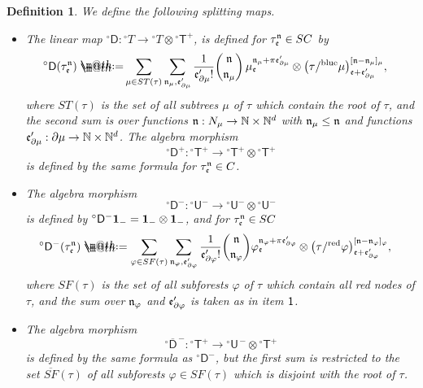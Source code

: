 \documentclass[10pt, reqno]{amsart}
\makeatletter
\numberwithin{subsection}{section}
\numberwithin{subsubsection}{subsection}
\numberwithin{equation}{section} %
\theoremstyle{mystyle}
\theoremstyle{mystyle2}
\newtheorem*{defn*} {Definition}
\theoremstyle{mystyle3}
\newcommand{\sfT}{\mathsf{T}}
\newcommand{\sfU}{\mathsf{U}}
\newcommand{\sfD}{\mathsf{D}}
\newcommand\bbN{\mathbb{N}}
\newcommand*{\defeq}{\mathrel{\rlap{%
                     \raisebox{0.3ex}{$\m@th\cdot$}}%
                     \raisebox{-0.3ex}{$\m@th\cdot$}}%
                     =}
\makeatother
\begin{document}
\begin{defn*}
We define the following splitting maps.
\begin{itemize}
\setlength{\itemsep}{0.15cm}
	\item[{\sf 1.}] The linear map ${^\circ}{\sfD} : {^\circ}T\to {^\circ}T\otimes {^\circ}{\sfT}^+$, is defined for $\tau_{\frak{e}}^{\frak{n}}\in SC$ by
\begin{equation*} \begin{split}
{^\circ}\sfD(\tau_{\frak{e}}^{\frak{n}}) \defeq & \sum_{\mu\in ST(\tau)} \sum_{\frak{n}_\mu, \frak{e}'_{\partial\mu}} 
\frac{1}{\frak{e}'_{\partial\mu}!}{{\frak{n}}\choose{\frak{n}_\mu}}
\, \mu^{\frak{n}_\mu+\pi\frak{e}'_{\partial\mu}}_{\frak{e}}
\otimes 
\big(\tau/^{\text{\rm blue}}\mu\big)^{[\frak{n}-\frak{n}_\mu]_\mu}_{\frak{e}+\frak{e}'_{\partial\mu}},
\end{split}  \end{equation*}
where $ST(\tau)$ is the set of all {\sl subtrees} $\mu$ of $\tau$ which contain the root of $\tau$, and the second sum is over functions $\frak{n}:N_\mu\to\bbN\times\bbN^d$ with $\frak{n}_\mu\leq \frak{n}$ and functions $\frak{e}'_{\partial\mu}: \partial\mu\rightarrow\bbN\times\bbN^d$. The algebra morphism 
$$
{^\circ}{\sfD}^+ : {^\circ}{\sfT}^+\to{^\circ}{\sfT}^+\otimes{^\circ}{\sfT}^+
$$ 
is defined by the same formula for $\tau_{\frak{e}}^{\frak{n}}\in C$.

	\item[{\sf 2.}] The algebra morphism 
	$$
	{^\circ}{\sfD}^-: {^\circ}{\sfU}^-\to{^\circ}{\sfU}^-\otimes {^\circ}{\sfU}^-
	$$ 
	is defined by ${^\circ}\sfD^-{\bf1}_-={\bf1}_-\otimes{\bf1}_-$, and for $\tau_{\frak{e}}^{\frak{n}}\in SC$
\begin{equation*} \begin{split}
{^\circ}{\sfD}^-(\tau_{\frak{e}}^{\frak{n}})
&\defeq  \sum_{\varphi\in SF(\tau)}\sum_{\frak{n}_\varphi, \frak{e}'_{\partial\varphi}} \frac{1}{\frak{e}'_{\partial\varphi}!}{{\frak{n}}\choose{\frak{n}_\varphi}}
\varphi^{\frak{n}_\varphi+\pi\frak{e}'_{\partial\varphi}}_{\frak{e}} 
\otimes \big(\tau/^{\text{\rm red}}\varphi\big)^{[\frak{n}-\frak{n_\varphi}]_\varphi}_{\frak{e}+\frak{e}'_{\partial\varphi}},
\end{split}  \end{equation*}
where $SF(\tau)$ is the set of all {\sl subforests} $\varphi$ of $\tau$ {\sl which contain all red nodes of $\tau$}, and the sum over $\frak{n}_\varphi$ and $\frak{e}_{\partial\varphi}'$ is taken as in item $\sf 1$.

	\item[{\sf 3.}] The algebra morphism 
	$$
	{^\circ}\overline{\sfD}^{\,-} : {^\circ}{\sfT}^+\to{^\circ}{\sfU}^{\,-}\otimes {^\circ}{\sfT}^+
	$$ 
	is defined by the same formula as ${^\circ}{\sfD}^-$, but the first sum is restricted to the set $\overline{SF}(\tau)$ of all subforests $\varphi\in SF(\tau)$ {\sl which is disjoint with the root of $\tau$}.
\end{itemize}
\end{defn*}
\end{document}
